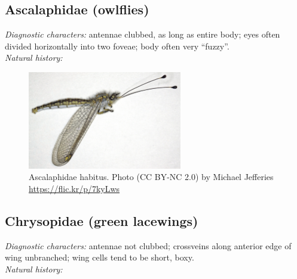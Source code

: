 \documentclass[letterpaper, 11pt]{article}
\begin{document}
\subsection{Ascalaphidae (owlflies)}
\noindent{}\textit{Diagnostic characters:} antennae clubbed, as long as entire body; eyes often divided horizontally into two foveae; body often very ``fuzzy''.\\

\noindent{}\textit{Natural history:}\\

\begin{figure}[ht!]
  \centering
    \includegraphics[width=0.6\textwidth]{AscalaphidHabitus}
  \caption{Ascalaphidae habitus. Photo (CC BY-NC 2.0) by Michael Jefferies \url{https://flic.kr/p/7kyLws}}
  \label{fig:ascalaph}
\end{figure}

\subsection{Chrysopidae (green lacewings)}
\noindent{}\textit{Diagnostic characters:} antennae not clubbed; crossveins along anterior edge of wing unbranched; wing cells tend to be short, boxy.\\

\noindent{}\textit{Natural history:}\\
\end{document}
